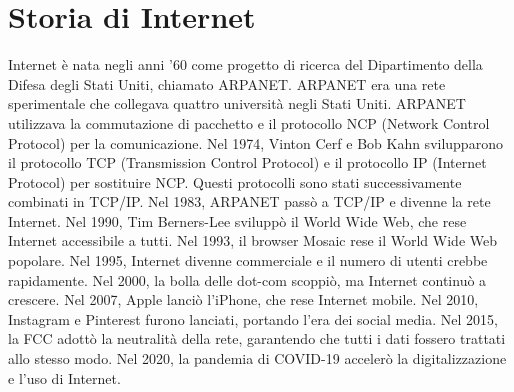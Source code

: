 \documentclass[12pt]{report}
\begin{document}
	\section{Storia di Internet}
	Internet è nata negli anni '60 come progetto di ricerca del Dipartimento della Difesa degli Stati Uniti, chiamato ARPANET. ARPANET era una rete sperimentale che collegava quattro università negli Stati Uniti. ARPANET utilizzava la commutazione di pacchetto e il protocollo NCP (Network Control Protocol) per la comunicazione. Nel 1974, Vinton Cerf e Bob Kahn svilupparono il protocollo TCP (Transmission Control Protocol) e il protocollo IP (Internet Protocol) per sostituire NCP. Questi protocolli sono stati successivamente combinati in TCP/IP. Nel 1983, ARPANET passò a TCP/IP e divenne la rete Internet. Nel 1990, Tim Berners-Lee sviluppò il World Wide Web, che rese Internet accessibile a tutti. Nel 1993, il browser Mosaic rese il World Wide Web popolare. Nel 1995, Internet divenne commerciale e il numero di utenti crebbe rapidamente. Nel 2000, la bolla delle dot-com scoppiò, ma Internet continuò a crescere. Nel 2007, Apple lanciò l'iPhone, che rese Internet mobile. Nel 2010, Instagram e Pinterest furono lanciati, portando l'era dei social media. Nel 2015, la FCC adottò la neutralità della rete, garantendo che tutti i dati fossero trattati allo stesso modo. Nel 2020, la pandemia di COVID-19 accelerò la digitalizzazione e l'uso di Internet.
\end{document}
